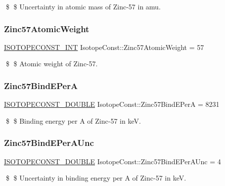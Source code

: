 \$ \$ Uncertainty in atomic mass of Zinc-\/57 in amu. \mbox{\label{group___isotope_const-_zinc-_zn57_gad21f80df3b80521ffa29cb1bd7037881}} 
\subsubsection{\texorpdfstring{Zinc57\+Atomic\+Weight}{Zinc57AtomicWeight}}
{\footnotesize\ttfamily \mbox{\hyperlink{group___isotope_const-_macros_ga5f18360b3e99483a35c32d789e62621c}{I\+S\+O\+T\+O\+P\+E\+C\+O\+N\+S\+T\+\_\+\+I\+NT}} Isotope\+Const\+::\+Zinc57\+Atomic\+Weight = 57}

\$ \$ Atomic weight of Zinc-\/57. \mbox{\label{group___isotope_const-_zinc-_zn57_ga2be44f871902f1088fb0a979701fc555}} 
\subsubsection{\texorpdfstring{Zinc57\+Bind\+E\+PerA}{Zinc57BindEPerA}}
{\footnotesize\ttfamily \mbox{\hyperlink{group___isotope_const-_macros_ga8f45a7272ce02c0b4c65c44636ed719a}{I\+S\+O\+T\+O\+P\+E\+C\+O\+N\+S\+T\+\_\+\+D\+O\+U\+B\+LE}} Isotope\+Const\+::\+Zinc57\+Bind\+E\+PerA = 8231}

\$ \$ Binding energy per A of Zinc-\/57 in keV. \mbox{\label{group___isotope_const-_zinc-_zn57_gab8b3a2d5304c928d37af93cd5ca4d451}} 
\subsubsection{\texorpdfstring{Zinc57\+Bind\+E\+Per\+A\+Unc}{Zinc57BindEPerAUnc}}
{\footnotesize\ttfamily \mbox{\hyperlink{group___isotope_const-_macros_ga8f45a7272ce02c0b4c65c44636ed719a}{I\+S\+O\+T\+O\+P\+E\+C\+O\+N\+S\+T\+\_\+\+D\+O\+U\+B\+LE}} Isotope\+Const\+::\+Zinc57\+Bind\+E\+Per\+A\+Unc = 4}

\$ \$ Uncertainty in binding energy per A of Zinc-\/57 in keV. \mbox{\label{group___isotope_const-_zinc-_zn57_gaa0a04fe4728758a63b9d7a47ad83dd01}} 
